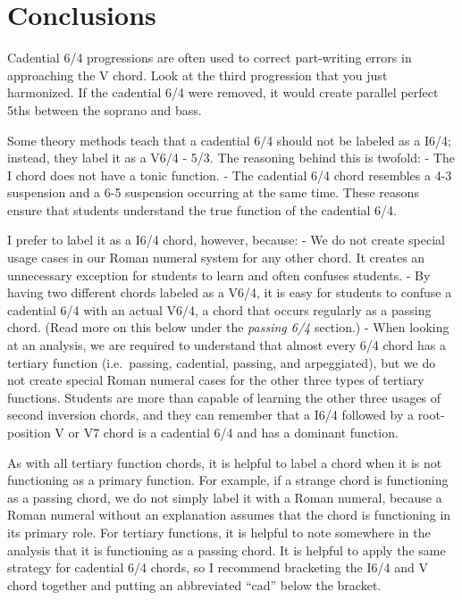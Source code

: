 \documentclass{book}
\begin{document}
\hypertarget{conclusions-68}{%
\section{Conclusions}\label{conclusions-68}}

Cadential 6/4 progressions are often used to correct part-writing errors in
approaching the V chord. Look at the third progression that you just
harmonized. If the cadential 6/4 were removed, it would create parallel
perfect 5ths between the soprano and bass.

Some theory methods teach that a cadential 6/4 should not be labeled as a
I6/4; instead, they label it as a V6/4 - 5/3. The reasoning behind this is
twofold: - The I chord does not have a tonic function. - The cadential 6/4
chord resembles a 4-3 suspension and a 6-5 suspension occurring at the same
time. These reasons ensure that students understand the true function of the
cadential 6/4.

I prefer to label it as a I6/4 chord, however, because: - We do not create
special usage cases in our Roman numeral system for any other chord. It
creates an unnecessary exception for students to learn and often confuses
students. - By having two different chords labeled as a V6/4, it is easy for
students to confuse a cadential 6/4 with an actual V6/4, a chord that occurs
regularly as a passing chord. (Read more on this below under the \emph{passing
6/4} section.) - When looking at an analysis, we are required to understand
that almost every 6/4 chord has a tertiary function (i.e.~passing, cadential,
passing, and arpeggiated), but we do not create special Roman numeral cases
for the other three types of tertiary functions. Students are more than
capable of learning the other three usages of second inversion chords, and
they can remember that a I6/4 followed by a root-position V or V7 chord is a
cadential 6/4 and has a dominant function.

As with all tertiary function chords, it is helpful to label a chord when it
is not functioning as a primary function. For example, if a strange chord is
functioning as a passing chord, we do not simply label it with a Roman
numeral, because a Roman numeral without an explanation assumes that the chord
is functioning in its primary role. For tertiary functions, it is helpful to
note somewhere in the analysis that it is functioning as a passing chord. It
is helpful to apply the same strategy for cadential 6/4 chords, so I recommend
bracketing the I6/4 and V chord together and putting an abbreviated ``cad''
below the bracket.
\end{document}
